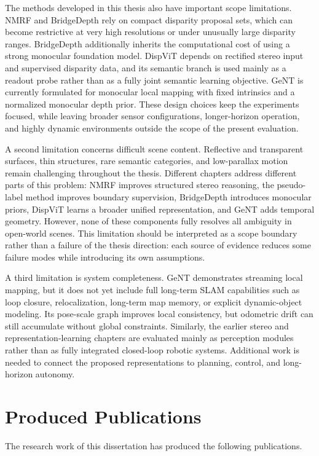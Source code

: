 The methods developed in this thesis also have important scope limitations.
NMRF and BridgeDepth rely on compact disparity proposal sets, which can become restrictive at very high resolutions or under unusually large disparity ranges.
BridgeDepth additionally inherits the computational cost of using a strong monocular foundation model.
DispViT depends on rectified stereo input and supervised disparity data, and its semantic branch is used mainly as a readout probe rather than as a fully joint semantic learning objective.
GeNT is currently formulated for monocular local mapping with fixed intrinsics and a normalized monocular depth prior.
These design choices keep the experiments focused, while leaving broader sensor configurations, longer-horizon operation, and highly dynamic environments outside the scope of the present evaluation.

A second limitation concerns difficult scene content.
Reflective and transparent surfaces, thin structures, rare semantic categories, and low-parallax motion remain challenging throughout the thesis.
Different chapters address different parts of this problem: NMRF improves structured stereo reasoning, the pseudo-label method improves boundary supervision, BridgeDepth introduces monocular priors, DispViT learns a broader unified representation, and GeNT adds temporal geometry.
However, none of these components fully resolves all ambiguity in open-world scenes.
This limitation should be interpreted as a scope boundary rather than a failure of the thesis direction: each source of evidence reduces some failure modes while introducing its own assumptions.

A third limitation is system completeness.
GeNT demonstrates streaming local mapping, but it does not yet include full long-term SLAM capabilities such as loop closure, relocalization, long-term map memory, or explicit dynamic-object modeling.
Its pose-scale graph improves local consistency, but odometric drift can still accumulate without global constraints.
Similarly, the earlier stereo and representation-learning chapters are evaluated mainly as perception modules rather than as fully integrated closed-loop robotic systems.
Additional work is needed to connect the proposed representations to planning, control, and long-horizon autonomy.

\section{Produced Publications}
The research work of this dissertation has produced the following publications.

